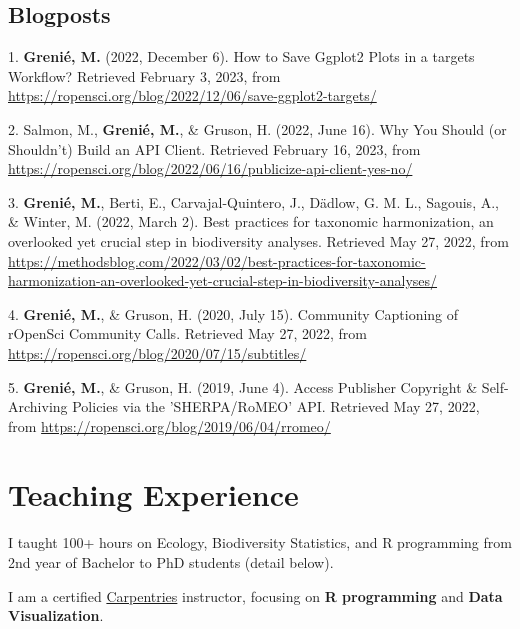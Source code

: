 \documentclass[10pt,a4paper,]{article}
\begin{document}
\hypertarget{blogposts}{%
\subsection{Blogposts}\label{blogposts}}

\hypertarget{bibliography}{}
\leavevmode{}%
1. \textbf{Grenié, M.} (2022, December 6). How to Save Ggplot2 Plots in
a targets Workflow? Retrieved February 3, 2023, from
\url{https://ropensci.org/blog/2022/12/06/save-ggplot2-targets/}

\leavevmode{}%
2. Salmon, M., \textbf{Grenié, M.}, \& Gruson, H. (2022, June 16). Why
You Should (or Shouldn't) Build an API Client. Retrieved February 16,
2023, from
\url{https://ropensci.org/blog/2022/06/16/publicize-api-client-yes-no/}

\leavevmode{}%
3. \textbf{Grenié, M.}, Berti, E., Carvajal-Quintero, J., Dädlow, G. M.
L., Sagouis, A., \& Winter, M. (2022, March 2). Best practices for
taxonomic harmonization, an overlooked yet crucial step in biodiversity
analyses. Retrieved May 27, 2022, from
\url{https://methodsblog.com/2022/03/02/best-practices-for-taxonomic-harmonization-an-overlooked-yet-crucial-step-in-biodiversity-analyses/}

\leavevmode{}%
4. \textbf{Grenié, M.}, \& Gruson, H. (2020, July 15). Community
Captioning of rOpenSci Community Calls. Retrieved May 27, 2022, from
\url{https://ropensci.org/blog/2020/07/15/subtitles/}

\leavevmode{}%
5. \textbf{Grenié, M.}, \& Gruson, H. (2019, June 4). Access Publisher
Copyright \& Self-Archiving Policies via the 'SHERPA/RoMEO' API.
Retrieved May 27, 2022, from
\url{https://ropensci.org/blog/2019/06/04/rromeo/}

\hypertarget{teaching-experience}{%
\section{Teaching Experience}\label{teaching-experience}}

I taught 100+ hours on Ecology, Biodiversity Statistics, and R
programming from 2nd year of Bachelor to PhD students (detail below).

I am a certified \href{https://carpentries.org/}{Carpentries}
instructor, focusing on \textbf{R programming} and \textbf{Data
Visualization}.
\end{document}
